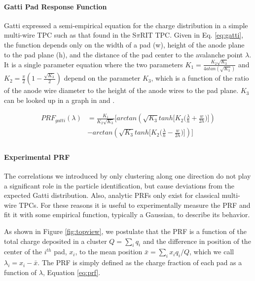\documentclass[review]{elsarticle}
\begin{document}
\paragraph{Gatti Pad Response Function}
Gatti \cite{gatti} expressed a semi-empirical equation for the charge distribution in a simple multi-wire TPC such as that found in the S$\pi$RIT TPC. Given in Eq. \ref{eq:gatti}, the function depends only on the width of a pad (w), height of the anode plane to the pad plane (h), and the distance of the pad center to the avalanche point $\lambda$. It is a single parameter equation where the two parameters $K_1 = \frac{K_{2}\sqrt{K_3}}{4 atan(\sqrt{K_3})}$ and $K_2 = \frac{\pi}{2}\left(1-\frac{\sqrt{K_{3}}}{2}\right)$ depend on the parameter $K_3$, which is a function of the ratio of the anode wire diameter to the height of the anode wires to the pad plane. $K_3$ can be looked up in a graph in \cite{blumrol} and \citep{gatti}.

\begin{equation}\label{eq:gatti}
\begin{split}
PRF_{gatti}(\lambda)
& = \frac{K_{1}}{K_{2}\sqrt{K_{3}}}\bigl[arctan(\sqrt{K_{3}}tanh\bigl[K_{2}\bigl(\frac{\lambda}{h}+\frac{w}{2h}\bigr)\bigr]) \\
& - arctan(\sqrt{K_{3}}tanh\bigl[K_{2}\bigl(\frac{\lambda}{h}-\frac{w}{2h}\bigr)\bigr])\bigr] \\
\end{split}
\end{equation}

\paragraph{Experimental PRF}

The correlations we introduced by only clustering along one direction do not play a significant role in the particle identification, but cause deviations from the expected Gatti distribution. Also, analytic PRFs only exist for classical multi-wire TPCs. For these reasons it is useful to experimentally measure the PRF and fit it with some empirical function, typically a Gaussian, to describe its behavior. 

As shown in Figure \ref{fig:topview}, we postulate that the PRF is a function of the total charge deposited in a cluster $Q = \sum_i q_i$ and the difference in position of the center of the $i^{th}$ pad, $x_i$, to the mean position $\bar{x} = \sum_i x_i q_i/Q$, which we call $\lambda_i = x_i-\bar{x}$. The PRF is simply defined as the charge fraction of each pad as a function of $\lambda$, Equation \ref{eq:prf}. 
\end{document}
